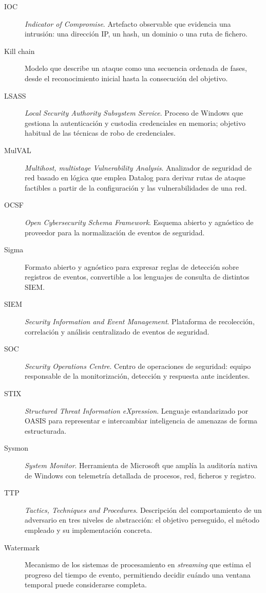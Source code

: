 \begin{description}
\item[IOC] \textit{Indicator of Compromise}. Artefacto observable que evidencia una
intrusión: una dirección IP, un hash, un dominio o una ruta de fichero.

\item[Kill chain] Modelo que describe un ataque como una secuencia ordenada de fases, desde
el reconocimiento inicial hasta la consecución del objetivo.

\item[LSASS] \textit{Local Security Authority Subsystem Service}. Proceso de Windows que
gestiona la autenticación y custodia credenciales en memoria; objetivo habitual de las
técnicas de robo de credenciales.

\item[MulVAL] \textit{Multihost, multistage Vulnerability Analysis}. Analizador de
seguridad de red basado en lógica que emplea Datalog para derivar rutas de ataque
factibles a partir de la configuración y las vulnerabilidades de una red.

\item[OCSF] \textit{Open Cybersecurity Schema Framework}. Esquema abierto y agnóstico de
proveedor para la normalización de eventos de seguridad.

\item[Sigma] Formato abierto y agnóstico para expresar reglas de detección sobre registros
de eventos, convertible a los lenguajes de consulta de distintos SIEM.

\item[SIEM] \textit{Security Information and Event Management}. Plataforma de recolección,
correlación y análisis centralizado de eventos de seguridad.

\item[SOC] \textit{Security Operations Centre}. Centro de operaciones de seguridad: equipo
responsable de la monitorización, detección y respuesta ante incidentes.

\item[STIX] \textit{Structured Threat Information eXpression}. Lenguaje estandarizado por
OASIS para representar e intercambiar inteligencia de amenazas de forma estructurada.

\item[Sysmon] \textit{System Monitor}. Herramienta de Microsoft que amplía la auditoría
nativa de Windows con telemetría detallada de procesos, red, ficheros y registro.

\item[TTP] \textit{Tactics, Techniques and Procedures}. Descripción del comportamiento de un
adversario en tres niveles de abstracción: el objetivo perseguido, el método empleado y su
implementación concreta.

\item[Watermark] Mecanismo de los sistemas de procesamiento en \textit{streaming} que estima
el progreso del tiempo de evento, permitiendo decidir cuándo una ventana temporal puede
considerarse completa.

\end{description}
